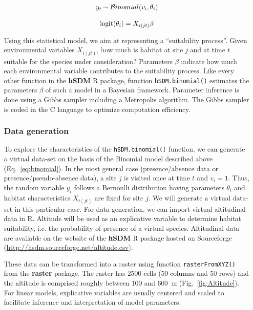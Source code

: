 \documentclass[a4paper, 12pt, leqno]{article}\usepackage[]{graphicx}\usepackage[]{color}
\newcommand{\logit}{\text{logit}}
\begin{document}
\begin{equation}
  \begin{tabular}{c}
    $y_i \sim \mathcal{B}inomial(v_i,\theta_i)$ \\
    ~ \\
    $\logit(\theta_i) = X_{i(jt)} \beta$ \\
  \end{tabular}
  \label{eq:binomial}
\end{equation}

Using this statistical model, we aim at representing a ``suitability process''. Given
environmental variables $X_{i(jt)}$, how much is habitat at site $j$ and at time $t$
suitable for the species under consideration? Parameters $\beta$ indicate how much each
environmental variable contributes to the suitability process. Like every other function
in the \textbf{hSDM} R package, function \texttt{hSDM.binomial()} estimates the parameters
$\beta$ of such a model in a Bayesian framework. Parameter inference is done using a Gibbs
sampler including a Metropolis algorithm. The Gibbs sampler is coded in the C language to
optimize computation efficiency.

\subsubsection{Data generation}

To explore the characteristics of the \texttt{hSDM.binomial()} function, we can generate a
virtual data-set on the basis of the Binomial model described above
(Eq.~\ref{eq:binomial}). In the most general case (presence/absence data or
presence/pseudo-absence data), a site $j$ is visited once at time $t$ and $v_i=1$. Thus,
the random variable $y_i$ follows a Bernoulli distribution having parameters $\theta_i$
and habitat characteristics $X_{i(jt)}$ are fixed for site $j$. We will generate a virtual
data-set in this particular case. For data generation, we can import virtual altitudinal
data in R. Altitude will be used as an explicative variable to determine habitat
suitability, i.e. the probability of presence of a virtual species. Altitudinal data are
available on the website of the \textbf{hSDM} R package hosted on Sourceforge
(\url{http://hsdm.sourceforge.net/altitude.csv}).

These data can be transformed into a raster using function \texttt{rasterFromXYZ()} from
the \textbf{raster} package. The raster has 2500 cells (50 columns and 50 rows) and the
altitude is comprised roughly between 100 and 600~m (Fig.~\ref{fig:Altitude}). For linear
models, explicative variables are usually centered and scaled to facilitate inference and
interpretation of model parameters.
\end{document}
